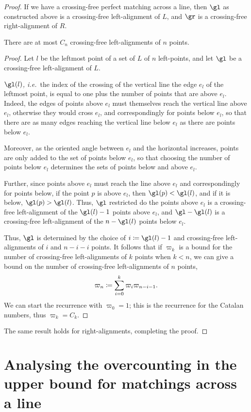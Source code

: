 \documentclass[10pt, a4paper, twoside]{basestyle}
\newcommand{\idest}{\emph{, i.e.\ }}
\begin{document}
\begin{theorem}
\begin{proof}
If we have a crossing-free perfect matching across a line, then $\gl$ as constructed above is a crossing-free
left-alignment of $L$, and $\gr$ is a crossing-free right-alignment of $R$.

\begin{lemma}
There are at most $C_n$ crossing-free left-alignments of $n$ points.
\begin{proof}
Let $l$ be the leftmost point of a set of $L$ of $n$ left-points, and let $\gl$ be a crossing-free
left-alignment of $L$.

$\gl(l)$\idest the index of the crossing of the vertical line the edge $e_l$ of the leftmost point,
is equal to one plus the number of points that are above $e_l$. Indeed, the edges of points above $e_l$ must
themselves reach the vertical line above $e_l$, otherwise they would cross $e_l$, and correspondingly for
points below $e_l$, so that there are as many edges reaching the vertical line below $e_l$ as there are points
below $e_l$.

Moreover, as the oriented angle between $e_l$ and the horizontal increases, points are only added to the
set of points below $e_l$, so that choosing the number of points below $e_l$ determines the sets of points
below and above $e_l$.

Further, since points above $e_l$ must reach the line above $e_l$ and correspondingly for points below,
if the point $p$ is above $e_l$, then $\gl(p) < \gl(l)$, and if it is below, $\gl(p) > \gl(l)$. Thus,
$\gl$ restricted do the points above $e_l$ is a crossing-free left-alignment of the $\gl(l) - 1$ points above
$e_l$, and $\gl-\gl(l)$ is a crossing-free left-alignment of the $n - \gl(l)$ points below $e_l$.

Thus, $\gl$ is determined by the choice of $i \DefineAs \gl(l) - 1$ and crossing-free left-alignments
of $i$ and $n-i-i$ points. It follows that if $\varpi_k$ is a bound for the number of crossing-free
left-alignments of $k$ points when $k < n$,
we can give a bound on the number of crossing-free left-alignments of $n$ points,
\[\varpi_n\DefineAs\sum{i=0}[k]\varpi_{i}\varpi_{n-i-1}\text.\]
We can start the recurrence with $\varpi_0 = 1$; this is the recurrence for the Catalan numbers, thus
$\varpi_k=C_k$.
\end{proof}
\end{lemma}
The same result holds for right-alignments, completing the proof.
\end{proof}
\end{theorem}
\section{Analysing the overcounting in the upper bound for matchings across a line}
\end{document}
